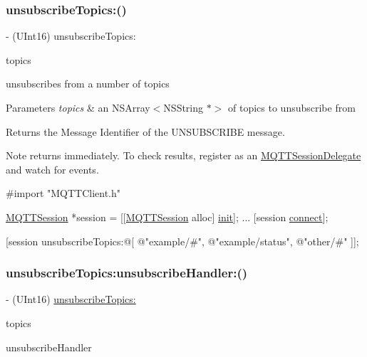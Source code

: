 \subsubsection{\texorpdfstring{unsubscribe\+Topics\+:()}{unsubscribeTopics:()}}
{\footnotesize\ttfamily -\/ (U\+Int16) unsubscribe\+Topics\+: \begin{DoxyParamCaption}\item[{(N\+S\+Array$<$ N\+S\+String $\ast$ $>$ $\ast$)}]{topics }\end{DoxyParamCaption}}

unsubscribes from a number of topics


\begin{DoxyParams}{Parameters}
{\em topics} & an N\+S\+Array$<$\+N\+S\+String $\ast$$>$ of topics to unsubscribe from\\
\hline
\end{DoxyParams}
\begin{DoxyReturn}{Returns}
the Message Identifier of the U\+N\+S\+U\+B\+S\+C\+R\+I\+BE message.
\end{DoxyReturn}
\begin{DoxyNote}{Note}
returns immediately. To check results, register as an \hyperlink{class_m_q_t_t_session_delegate-p}{M\+Q\+T\+T\+Session\+Delegate} and watch for events.
\end{DoxyNote}

\begin{DoxyCode}
\textcolor{preprocessor}{#import "MQTTClient.h"}

\hyperlink{interface_m_q_t_t_session}{MQTTSession} *session = [[\hyperlink{interface_m_q_t_t_session}{MQTTSession} alloc] \hyperlink{interface_m_q_t_t_session_aee55d52a9b6395f1a0d73b672900629c}{init}];
...
[session \hyperlink{interface_m_q_t_t_session_ad443eb80793d71150a825513303405b5}{connect}];

[session unsubscribeTopics:@[
\textcolor{stringliteral}{@"example/#"},
\textcolor{stringliteral}{@"example/status"},
\textcolor{stringliteral}{@"other/#"}
]];
\end{DoxyCode}
 \mbox{\label{interface_m_q_t_t_session_a1d566cac765cdcdb2563ffa45ef53bbe}} 
\subsubsection{\texorpdfstring{unsubscribe\+Topics\+:unsubscribe\+Handler\+:()}{unsubscribeTopics:unsubscribeHandler:()}}
{\footnotesize\ttfamily -\/ (U\+Int16) \hyperlink{interface_m_q_t_t_session_ac93b09cbe98c4b8754180e344ef7e908}{unsubscribe\+Topics\+:} \begin{DoxyParamCaption}\item[{(N\+S\+Array$<$ N\+S\+String $\ast$ $>$ $\ast$)}]{topics }\item[{unsubscribeHandler:(M\+Q\+T\+T\+Unsubscribe\+Handler)}]{unsubscribe\+Handler }\end{DoxyParamCaption}}

